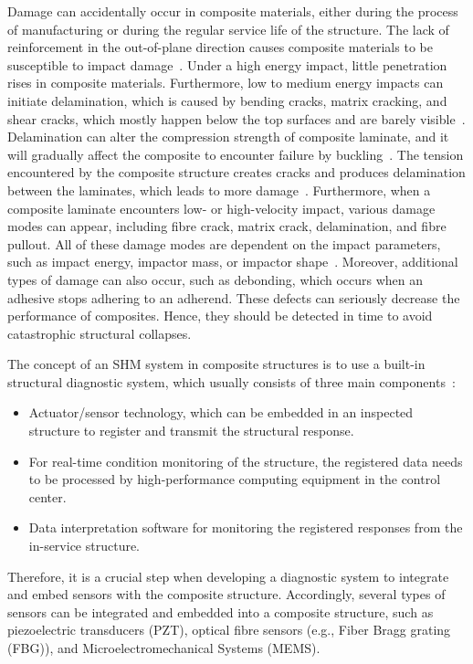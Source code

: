 Damage can accidentally occur in composite materials, either during the process of manufacturing or during the regular service life of the structure.
The lack of reinforce\-ment in the out-of-plane direction causes composite materials to be susceptible to impact damage~\cite{Cai2012}. 
Under a high energy impact, little penetration rises in composite materials.  
Furthermore, low to medium energy impacts can initiate delamination, which is caused by bending cracks, matrix cracking, and shear cracks,  which mostly happen below the top surfaces and are barely visible~\cite{Cai2012}. 
Delamination can alter the compression strength of composite laminate, and it will gradually affect the composite to encounter failure by buckling~\cite{NurAzrieBtSafri2018}.
The tension encountered by the composite structure creates cracks and produces delamination between the laminates, which leads to more damage~\cite{NurAzrieBtSafri2018}. 
Furthermore, when a composite laminate encounters low- or high-velocity impact, various damage modes can appear, including fibre crack, matrix crack, delamination, and fibre pullout.
All of these damage modes are dependent on the impact parameters, such as impact energy, impactor mass, or impactor shape~\cite{NurAzrieBtSafri2018}.
Moreover, additional types of damage can also occur, such as debonding, which occurs when an adhesive stops adhering to an adherend.
These defects can seriously decrease the performance of composites. Hence, they should be detected in time to avoid catastrophic structural collapses.

The concept of an SHM system in composite structures is to use a built-in structural diagnostic system, which usually consists of three main components~\cite{Hassani2022}: 
\begin{itemize}
	\item Actuator/sensor technology, which can be embedded in an inspected structure to register and transmit the structural response.
	\item For real-time condition monitoring of the structure, the registered data needs to be processed by high-performance computing equipment in the control center.
	\item Data interpretation software for monitoring the registered responses from the in-service structure.
\end{itemize}
Therefore, it is a crucial step when developing a diagnostic system to integrate and embed sensors with the composite structure.
Accordingly, several types of sensors can be integrated and embedded into a composite structure, such as piezoelectric transducers (PZT), optical fibre sensors (e.g., Fiber Bragg grating (FBG)), and Micro\-electromechanical Systems (MEMS).

